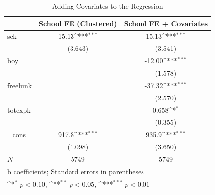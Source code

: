 \begin{table}[htbp]\centering
\def\sym#1{\ifmmode^{#1}\else\(^{#1}\)\fi}
\caption{Adding Covariates to the Regression}
\begin{tabular}{l*{2}{c}}
\hline\hline
            &\multicolumn{1}{c}{School FE (Clustered)}&\multicolumn{1}{c}{School FE + Covariates}\\
\hline
sck         &       15.13\sym{***}&       15.13\sym{***}\\
            &     (3.643)         &     (3.541)         \\
[1em]
boy         &                     &      -12.00\sym{***}\\
            &                     &     (1.578)         \\
[1em]
freelunk    &                     &      -37.32\sym{***}\\
            &                     &     (2.570)         \\
[1em]
totexpk     &                     &       0.658\sym{*}  \\
            &                     &     (0.355)         \\
[1em]
\_cons      &       917.8\sym{***}&       935.9\sym{***}\\
            &     (1.098)         &     (3.650)         \\
\hline
\(N\)       &        5749         &        5749         \\
\hline\hline
\multicolumn{3}{l}{\footnotesize b coefficients; Standard errors in parentheses}\\
\multicolumn{3}{l}{\footnotesize \sym{*} \(p<0.10\), \sym{**} \(p<0.05\), \sym{***} \(p<0.01\)}\\
\end{tabular}
\end{table}
